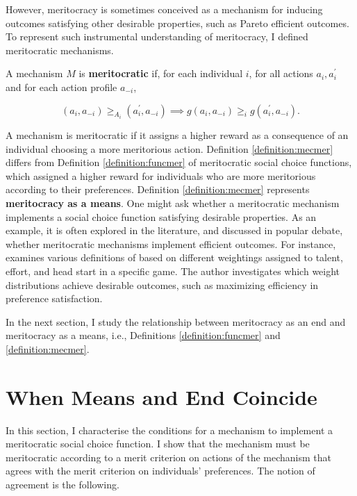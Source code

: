 However, meritocracy is sometimes conceived as a mechanism for inducing outcomes satisfying other desirable properties, such as Pareto efficient outcomes. To represent such instrumental understanding of meritocracy, I defined meritocratic mechanisms.

\begin{definition}\label{definition:mecmer}
	A mechanism \( M \) is \textbf{meritocratic} if, for each individual \( i \), for all actions \( a_i, a_i^{\prime} \) and for each action profile \( a_{-i} \),

	\[ ( a_i, a_{-i} ) \geq_{A_i} ( a^{\prime}_i, a_{-i} ) \implies g ( a_i, a_{-i} ) \geq_i g ( a^{\prime}_i, a_{-i} ) .\]
\end{definition}

A mechanism is meritocratic if it assigns a higher reward as a consequence of an individual choosing a more meritorious action. Definition \ref{definition:mecmer} differs from Definition \ref{definition:funcmer} of meritocratic social choice functions, which assigned a higher reward for individuals who are more meritorious according to their preferences. Definition \ref{definition:mecmer} represents \textbf{meritocracy as a means}. One might ask whether a meritocratic mechanism implements a social choice function satisfying desirable properties. As an example, it is often explored in the literature, and discussed in popular debate, whether meritocratic mechanisms implement efficient outcomes. For instance, \cite{moisson2024meritocracy} examines various definitions of  based on different weightings assigned to talent, effort, and head start in a specific game. The author investigates which weight distributions achieve desirable outcomes, such as maximizing efficiency in preference satisfaction.

In the next section, I study the relationship between meritocracy as an end and meritocracy as a means, i.e., Definitions \ref{definition:funcmer} and \ref{definition:mecmer}.

\section{When Means and End Coincide}\label{sec:agree}

In this section, I characterise the conditions for a mechanism to implement a meritocratic social choice function. I show that the mechanism must be meritocratic according to a merit criterion on actions of the mechanism that agrees with the merit criterion on individuals' preferences. The notion of agreement is the following.

